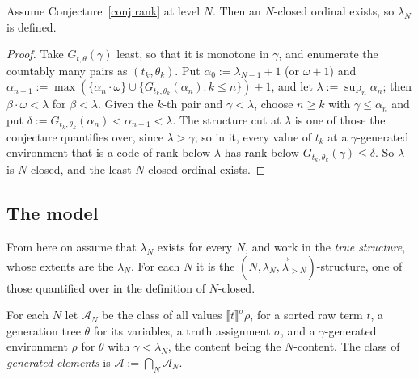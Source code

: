 \documentclass[10pt]{article}
\newcommand{\sem}[1]{\llbracket #1\rrbracket}
\begin{document}
\begin{lemma}\label{lem:closedex}
Assume Conjecture~\ref{conj:rank} at level $N$. Then an $N$-closed
ordinal exists, so $\lambda_N$ is defined.
\end{lemma}
\begin{proof}
Take $G_{t,\theta}(\gamma)$ least, so that it is monotone in $\gamma$, and
enumerate the countably many pairs as $(t_k,\theta_k)$. Put
$\alpha_0:=\lambda_{N-1}+1$ (or $\omega+1$) and
$\alpha_{n+1}:=\max(\{\alpha_n\cdot\omega\}\cup\{G_{t_k,\theta_k}(\alpha_n):k\le n\})+1$,
and let $\lambda:=\sup_n\alpha_n$; then $\beta\cdot\omega<\lambda$ for
$\beta<\lambda$. Given the $k$-th pair and $\gamma<\lambda$, choose
$n\ge k$ with $\gamma\le\alpha_n$ and put
$\delta:=G_{t_k,\theta_k}(\alpha_n)<\alpha_{n+1}<\lambda$. The structure
cut at $\lambda$ is one of those the conjecture quantifies over, since
$\lambda>\gamma$; so in it, every value of $t_k$ at a $\gamma$-generated
environment that is a code of rank below $\lambda$ has rank below
$G_{t_k,\theta_k}(\gamma)\le\delta$. So $\lambda$ is $N$-closed, and the
least $N$-closed ordinal exists.
\end{proof}

\subsection{The model}\label{sec:adm}

From here on assume that $\lambda_N$ exists for every $N$, and work in
the \emph{true structure}, whose extents are the $\lambda_N$. For each
$N$ it is the $(N,\lambda_N,\vec\lambda_{>N})$-structure, one of those
quantified over in the definition of $N$-closed.

\begin{definition}\label{def:adm}
For each $N$ let $\mathcal A_N$ be the class of all values
$\sem t^\sigma\rho$, for a sorted raw term $t$, a generation tree $\theta$
for its variables, a truth assignment $\sigma$, and a $\gamma$-generated
environment $\rho$ for $\theta$ with $\gamma<\lambda_N$, the content being
the $N$-content. The class of \emph{generated elements} is
$\mathcal A:=\bigcap_N\mathcal A_N$.
\end{definition}
\end{document}
